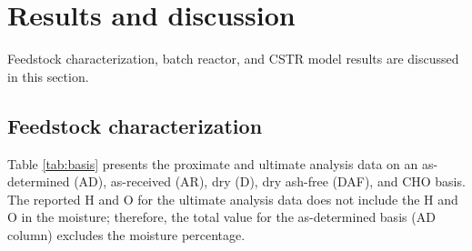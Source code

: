 
\section{Results and discussion}

Feedstock characterization, batch reactor, and CSTR model results are discussed in this section.

\subsection{Feedstock characterization}

Table \ref{tab:basis} presents the proximate and ultimate analysis data on an as-determined (AD), as-received (AR), dry (D), dry ash-free (DAF), and CHO basis. The reported H and O for the ultimate analysis data does not include the H and O in the moisture; therefore, the total value for the as-determined basis (AD column) excludes the moisture percentage.

